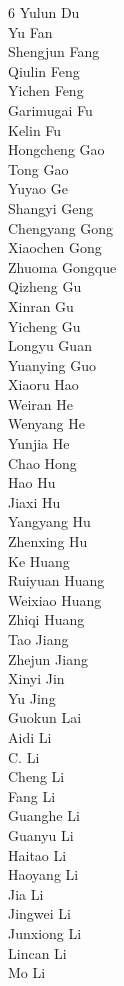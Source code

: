 \documentclass{article}
\begin{document}
\begin{multicols}{6}
{Yulun Du\\
Yu Fan\\
Shengjun Fang\\
Qiulin Feng\\
Yichen Feng\\
Garimugai Fu\\
Kelin Fu\\
Hongcheng Gao\\
Tong Gao\\
Yuyao Ge\\
Shangyi Geng\\
Chengyang Gong\\
Xiaochen Gong\\
Zhuoma Gongque\\
Qizheng Gu\\
Xinran Gu\\
Yicheng Gu\\
Longyu Guan\\
Yuanying Guo\\
Xiaoru Hao\\
Weiran He\\
Wenyang He\\
Yunjia He\\
Chao Hong\\
Hao Hu\\
Jiaxi Hu\\
Yangyang Hu\\
Zhenxing Hu\\
Ke Huang\\
Ruiyuan Huang\\
Weixiao Huang\\
Zhiqi Huang\\
Tao Jiang\\
Zhejun Jiang\\
Xinyi Jin\\
Yu Jing\\
Guokun Lai\\
Aidi Li\\
C. Li\\
Cheng Li\\
Fang Li\\
Guanghe Li\\
Guanyu Li\\
Haitao Li\\
Haoyang Li\\
Jia Li\\
Jingwei Li\\
Junxiong Li\\
Lincan Li\\
Mo Li\\
}
\end{multicols}
\end{document}
